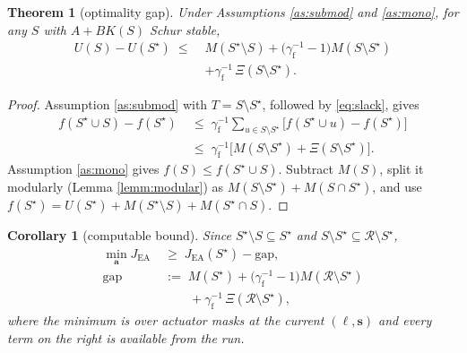 \documentclass[letterpaper, 10pt, conference]{ieeeconf}
\newtheorem{corollary}{Corollary}
\newtheorem{theorem}{Theorem}
\begin{document}
\begin{theorem}[optimality gap]\label{thm:gap}
Under Assumptions \ref{as:submod} and \ref{as:mono}, for any $S$ with $A+BK(S)$
Schur stable,
\begin{equation}\label{eq:gap}
\begin{aligned}
  U(S)-U(S^\star) \;\leq\;& M(S^\star\!\setminus S)
  + \bigl(\gamma_{\mathrm{f}}^{-1}\!-\!1\bigr) M(S\setminus S^\star)\\
  &+ \gamma_{\mathrm{f}}^{-1}\,\Xi(S\setminus S^\star).
\end{aligned}
\end{equation}
\end{theorem}
\begin{proof}
Assumption \ref{as:submod} with $T = S\setminus S^\star$, followed by
\eqref{eq:slack}, gives
\begin{equation*}
\begin{aligned}
  f(S^\star\!\cup S)-f(S^\star)
  &\;\leq\; \gamma_{\mathrm{f}}^{-1}\!\!\!\sum_{u\in S\setminus S^\star}\!\!\!\bigl[f(S^\star\!\cup u)-f(S^\star)\bigr]\\
  &\;\leq\; \gamma_{\mathrm{f}}^{-1}\bigl[M(S\setminus S^\star)+\Xi(S\setminus S^\star)\bigr].
\end{aligned}
\end{equation*}
Assumption \ref{as:mono} gives $f(S)\leq f(S^\star\cup S)$. Subtract $M(S)$, split
it modularly (Lemma \ref{lemm:modular}) as $M(S\setminus S^\star)+M(S\cap S^\star)$,
and use $f(S^\star) = U(S^\star)+M(S^\star\!\setminus S)+M(S^\star\!\cap S)$.
\end{proof}

\begin{corollary}[computable bound]\label{cor:gap}
Since $S^\star\!\setminus S\subseteq S^\star$ and
$S\setminus S^\star\subseteq\mathcal{R}\setminus S^\star$,
\begin{equation}\label{eq:gap-computable}
\begin{aligned}
  \min_{\mathbf{a}} J_\mathrm{EA} \;&\geq\; J_\mathrm{EA}(S^\star) - \mathrm{gap},\\
  \mathrm{gap} \;&:=\; M(S^\star) + \bigl(\gamma_{\mathrm{f}}^{-1}\!-\!1\bigr)M(\mathcal{R}\setminus S^\star)\\
  &\qquad + \gamma_{\mathrm{f}}^{-1}\,\Xi(\mathcal{R}\setminus S^\star),
\end{aligned}
\end{equation}
where the minimum is over actuator masks at the current $(\ell,\mathbf{s})$ and
every term on the right is available from the run.
\end{corollary}
\end{document}
